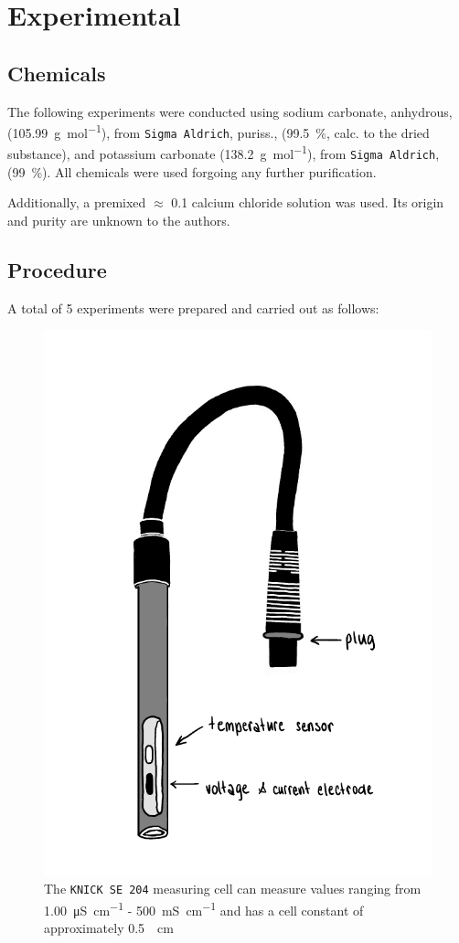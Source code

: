 \section{Experimental}



\subsection{Chemicals}
The following experiments were conducted using sodium carbonate, anhydrous, (\qty{105.99}{\gram\per\mole}), from \texttt{Sigma Aldrich}, puriss., (\qty{99.5}{\percent}, calc. to the dried substance), and potassium carbonate (\qty{138.2}{\gram\per\mole}), from \texttt{Sigma Aldrich}, (\qty{99}{\percent}). All chemicals were used forgoing any further purification.

Additionally, a premixed $\approx$ \qty{0.1}{\M} calcium chloride solution was used. Its origin and purity are unknown to the authors.

\subsection{Procedure}
A total of 5 experiments were prepared and carried out as follows:

\begin{figure}[H]
    \centering
    \includegraphics[width=.5\textwidth]{figures/Conductometer.pdf}
    \caption{The \texttt{KNICK SE 204} measuring cell can measure values ranging from \qty{1.00}{\micro\siemens\per\centi\meter} - \qty{500}{\milli\siemens\per\centi\meter} and has a cell constant of approximately \qty[per-mode=reciprocal]{0.5}{\per\centi\meter}}
    \label{fig:sketch_cond}
\end{figure}






